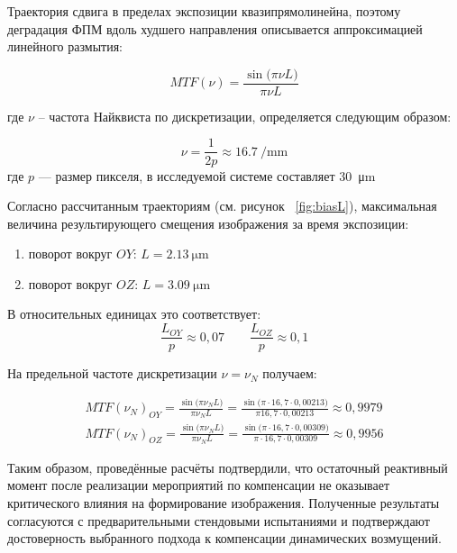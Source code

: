  Траектория сдвига в пределах экспозиции квазипрямолинейна, поэтому деградация ФПМ вдоль худшего направления описывается аппроксимацией линейного размытия:
 
 \begin{equation}
 	\label{eq:MTF_aprox}
 	MTF(\nu) = \frac{\sin\!\bigl(\pi \nu L\bigr)}{\pi \nu L}
 \end{equation}
 
 где \(\nu\) -- частота Найквиста по дискретизации, определяется следующим образом:
 
 \begin{equation}
 	\label{eq:nykvist}
 	\nu = \frac{1}{2p} \approx \SI{16.7}{\per\milli\meter}
 \end{equation}
 где \(p\) --- размер пикселя, в исследуемой системе составляет \SI{30}{\micro\meter}
 
 Согласно рассчитанным траекториям (см. рисунок ~\ref{fig:biasL}), максимальная величина результирующего смещения изображения за время экспозиции:
 \begin{enumerate}
 	\item поворот вокруг $OY$: $L= \SI{2,13}{\micro\meter}$
 	\item поворот вокруг $OZ$: $L= \SI{3,09}{\micro\meter}$
 \end{enumerate}
 
 В относительных единицах это соответствует:
 \begin{equation}
 	\frac{L_{OY}}{p} \approx 0,07 \quad \quad \frac{L_{OZ}}{p} \approx 0,1
 \end{equation}
 
 На предельной частоте дискретизации $\nu = \nu_N$ получаем:
 
 \begin{equation}
 	\begin{split}
 		\label{eq:MTF_result}
 		MTF(\nu_N)_{OY}=\frac{\sin\!\bigl(\pi \nu_N L\bigr)}{\pi \nu_N L} =  \frac{\sin\!\bigl(\pi \cdot 16,7 \cdot 0,00213 \bigr)}{\pi 16,7 \cdot 0,00213} \approx  0,9979\\
 		MTF(\nu_N)_{OZ}=\frac{\sin\!\bigl(\pi \nu_N L\bigr)}{\pi \nu_N L} =  \frac{\sin\!\bigl(\pi \cdot 16,7 \cdot 0,00309 \bigr)}{\pi \cdot 16,7 \cdot 0,00309} \approx 0,9956
 	\end{split}
 \end{equation}
 
Таким образом, проведённые расчёты подтвердили, что остаточный реактивный момент после реализации мероприятий по компенсации не оказывает критического влияния на формирование изображения. Полученные результаты согласуются с предварительными стендовыми испытаниями и подтверждают достоверность выбранного подхода к компенсации динамических возмущений.
 
